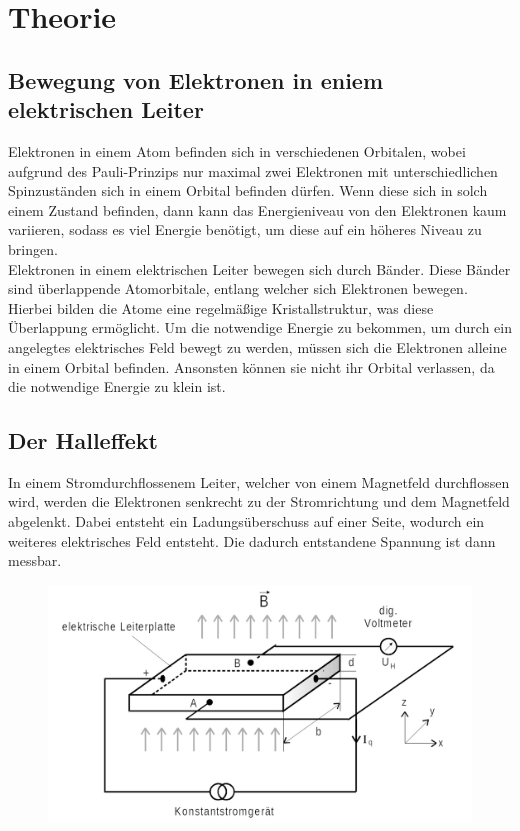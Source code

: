 \section{Theorie}
\label{sec:Theorie}

\subsection{Bewegung von Elektronen in eniem elektrischen Leiter}

\noindent Elektronen in einem Atom befinden sich in verschiedenen Orbitalen, wobei aufgrund des Pauli-Prinzips nur maximal
zwei Elektronen mit unterschiedlichen Spinzuständen sich in einem Orbital befinden dürfen. Wenn diese sich in solch
einem Zustand befinden, dann kann das Energieniveau von den Elektronen kaum variieren, sodass es viel Energie
benötigt, um diese auf ein höheres Niveau zu bringen. \\

\noindent Elektronen in einem elektrischen Leiter bewegen sich durch Bänder. Diese Bänder sind überlappende Atomorbitale,
entlang welcher sich Elektronen bewegen. Hierbei bilden die Atome eine regelmäßige Kristallstruktur, was diese 
Überlappung ermöglicht. Um die notwendige Energie zu bekommen, um durch ein angelegtes elektrisches
Feld bewegt zu werden, müssen sich die Elektronen alleine in einem Orbital befinden. Ansonsten können sie nicht
ihr Orbital verlassen, da die notwendige Energie zu klein ist. 

\subsection{Der Halleffekt}

In einem Stromdurchflossenem Leiter, welcher von einem Magnetfeld durchflossen wird, werden die Elektronen senkrecht
zu der Stromrichtung und dem Magnetfeld abgelenkt. Dabei entsteht ein Ladungsüberschuss auf einer Seite, wodurch 
ein weiteres elektrisches Feld entsteht. Die dadurch entstandene Spannung ist dann messbar.
\begin{figure}[H]
    \centering
    \includegraphics{Bilder/Halleffekt.png}
    \label{fig:Halleffekt}
\end{figure}

